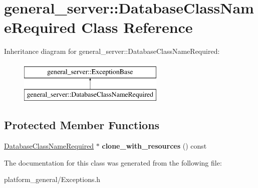 \hypertarget{classgeneral__server_1_1DatabaseClassNameRequired}{\section{general\-\_\-server\-:\-:\-Database\-Class\-Name\-Required \-Class \-Reference}
\label{classgeneral__server_1_1DatabaseClassNameRequired}
}
\-Inheritance diagram for general\-\_\-server\-:\-:\-Database\-Class\-Name\-Required\-:\begin{figure}[H]
\begin{center}
\leavevmode
\includegraphics[height=2.000000cm]{classgeneral__server_1_1DatabaseClassNameRequired}
\end{center}
\end{figure}
\subsection*{\-Protected \-Member \-Functions}
\begin{DoxyCompactItemize}
\item 
\hypertarget{classgeneral__server_1_1DatabaseClassNameRequired_a60718c034263d5ce97a24caa897ce75d}{\hyperlink{classgeneral__server_1_1DatabaseClassNameRequired}{\-Database\-Class\-Name\-Required} $\ast$ {\bfseries clone\-\_\-with\-\_\-resources} () const }\label{classgeneral__server_1_1DatabaseClassNameRequired_a60718c034263d5ce97a24caa897ce75d}

\end{DoxyCompactItemize}


\-The documentation for this class was generated from the following file\-:\begin{DoxyCompactItemize}
\item 
platform\-\_\-general/\-Exceptions.\-h\end{DoxyCompactItemize}

